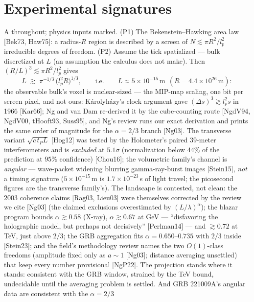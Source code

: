 \documentclass[11pt]{article}
\begin{document}
\section{Experimental signatures}

A \proj{} throughout; physics inputs marked. (P1) The Bekenstein--Hawking
area law [Bek73, Haw75]: a radius-$R$ region is described by a screen of
$N \lesssim \pi R^2/l_p^2$ irreducible degrees of freedom. (P2) Assume the
tick spatialized --- bulk discretized at $L$ (an assumption the calculus does
not make). Then $(R/L)^3 \lesssim \pi R^2/l_p^2$ gives
\begin{equation}
L \;\gtrsim\; \pi^{-1/3}\,\bigl(l_p^2 R\bigr)^{1/3},
\qquad\text{i.e.}\qquad
L \approx 5\times10^{-15}\,\mathrm{m}\ \ (R = 4.4\times10^{26}\,\mathrm{m}):
\end{equation}
the observable bulk's voxel is nuclear-sized --- the MIP-map scaling, one bit
per screen pixel, and not ours: K\'arolyh\'azy's clock argument gave
$(\Delta s)^3 \gtrsim l_p^2 s$ in 1966 [Kar66]; Ng and van Dam re-derived it by the
cube-counting route [NgdV94, NgdV00, tHooft93, Suss95], and Ng's review runs our exact
derivation and prints the same order of magnitude for the $\alpha = 2/3$
branch [Ng03]. The
transverse variant $\sqrt{c\,t_P L}$ [Hog12] was tested by the Holometer's
paired 39-meter interferometers and is \emph{excluded} at $5.1\sigma$
(normalization below $44\%$ of the prediction at $95\%$ confidence)
[Chou16]; the volumetric family's channel is \emph{angular} --- wave-packet
widening blurring gamma-ray-burst images [Stein15], \emph{not} a timing
signature ($5\times10^{-15}\,$m is $1.7\times10^{-23}\,$s of light travel;
the picosecond figures are the transverse family's). The landscape is
contested, not clean: the 2003 coherence claims [Rag03, Lieu03] were
themselves corrected by the review we cite [Ng03] (the claimed exclusions
overestimated by $(L/\lambda)^{\alpha}$); the blazar program bounds
$\alpha \gtrsim 0.58$ (X-ray), $\alpha \gtrsim 0.67$ at GeV ---
``disfavoring the holographic model, but
perhaps not decisively'' [Perlman14] --- and $\gtrsim 0.72$ at TeV, just
above $2/3$; the GRB aggregation fits $\alpha = 0.650$--$0.735$ with
$2/3$ inside [Stein23]; and the field's methodology review names the two
$O(1)$-class freedoms (amplitude fixed only as $a \sim 1$ [Ng03]; distance
averaging unsettled) that keep every number provisional [NgP22]. The
projection stands where it stands: consistent with the GRB window,
strained by the TeV bound, undecidable until the averaging problem is
settled. And GRB 221009A's angular data are consistent with the $\alpha = 2/3$
\end{document}
